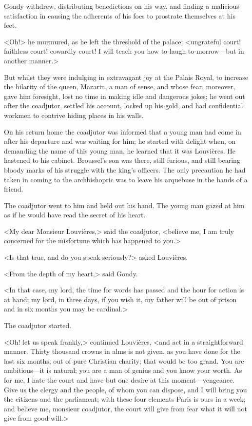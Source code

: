 Gondy withdrew, distributing benedictions on his way, and finding a malicious satisfaction in causing the adherents of his foes to prostrate themselves at his feet.

<Oh!> he murmured, as he left the threshold of the palace: <ungrateful court! faithless court! cowardly court! I will teach you how to laugh to-morrow—but in another manner.>

But whilst they were indulging in extravagant joy at the Palais Royal, to increase the hilarity of the queen, Mazarin, a man of sense, and whose fear, moreover, gave him foresight, lost no time in making idle and dangerous jokes; he went out after the coadjutor, settled his account, locked up his gold, and had confidential workmen to contrive hiding places in his walls.

On his return home the coadjutor was informed that a young man had come in after his departure and was waiting for him; he started with delight when, on demanding the name of this young man, he learned that it was Louvières. He hastened to his cabinet. Broussel's son was there, still furious, and still bearing bloody marks of his struggle with the king's officers. The only precaution he had taken in coming to the archbishopric was to leave his arquebuse in the hands of a friend.

The coadjutor went to him and held out his hand. The young man gazed at him as if he would have read the secret of his heart.

<My dear Monsieur Louvières,> said the coadjutor, <believe me, I am truly concerned for the misfortune which has happened to you.>

<Is that true, and do you speak seriously?> asked Louvières.

<From the depth of my heart,> said Gondy.

<In that case, my lord, the time for words has passed and the hour for action is at hand; my lord, in three days, if you wish it, my father will be out of prison and in six months you may be cardinal.>

The coadjutor started.

<Oh! let us speak frankly,> continued Louvières, <and act in a straightforward manner. Thirty thousand crowns in alms is not given, as you have done for the last six months, out of pure Christian charity; that would be too grand. You are ambitious—it is natural; you are a man of genius and you know your worth. As for me, I hate the court and have but one desire at this moment—vengeance. Give us the clergy and the people, of whom you can dispose, and I will bring you the citizens and the parliament; with these four elements Paris is ours in a week; and believe me, monsieur coadjutor, the court will give from fear what it will not give from good-will.>

